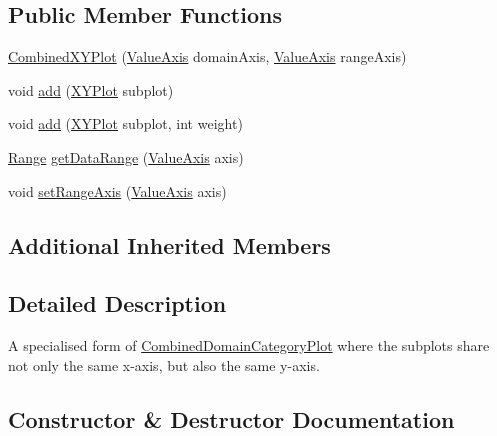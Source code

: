 \subsection*{Public Member Functions}
\begin{DoxyCompactItemize}
\item 
\mbox{\hyperlink{classorg_1_1jfree_1_1experimental_1_1chart_1_1plot_1_1_combined_x_y_plot_ac46652e5b0c36e5659511844a2f9e1cc}{Combined\+X\+Y\+Plot}} (\mbox{\hyperlink{classorg_1_1jfree_1_1chart_1_1axis_1_1_value_axis}{Value\+Axis}} domain\+Axis, \mbox{\hyperlink{classorg_1_1jfree_1_1chart_1_1axis_1_1_value_axis}{Value\+Axis}} range\+Axis)
\item 
void \mbox{\hyperlink{classorg_1_1jfree_1_1experimental_1_1chart_1_1plot_1_1_combined_x_y_plot_a36aac26f10cc8146a87f4b97f63bf9a1}{add}} (\mbox{\hyperlink{classorg_1_1jfree_1_1chart_1_1plot_1_1_x_y_plot}{X\+Y\+Plot}} subplot)
\item 
void \mbox{\hyperlink{classorg_1_1jfree_1_1experimental_1_1chart_1_1plot_1_1_combined_x_y_plot_a6548034d14f99973170b81ed654d6f47}{add}} (\mbox{\hyperlink{classorg_1_1jfree_1_1chart_1_1plot_1_1_x_y_plot}{X\+Y\+Plot}} subplot, int weight)
\item 
\mbox{\hyperlink{classorg_1_1jfree_1_1data_1_1_range}{Range}} \mbox{\hyperlink{classorg_1_1jfree_1_1experimental_1_1chart_1_1plot_1_1_combined_x_y_plot_aaf329d72ed5675a4fc2df0cc87300924}{get\+Data\+Range}} (\mbox{\hyperlink{classorg_1_1jfree_1_1chart_1_1axis_1_1_value_axis}{Value\+Axis}} axis)
\item 
void \mbox{\hyperlink{classorg_1_1jfree_1_1experimental_1_1chart_1_1plot_1_1_combined_x_y_plot_a310eec01cdf4a90b7ceef044e748d9bb}{set\+Range\+Axis}} (\mbox{\hyperlink{classorg_1_1jfree_1_1chart_1_1axis_1_1_value_axis}{Value\+Axis}} axis)
\end{DoxyCompactItemize}
\subsection*{Additional Inherited Members}


\subsection{Detailed Description}
A specialised form of \mbox{\hyperlink{}{Combined\+Domain\+Category\+Plot}} where the subplots share not only the same x-\/axis, but also the same y-\/axis. 

\subsection{Constructor \& Destructor Documentation}
\mbox{\label{classorg_1_1jfree_1_1experimental_1_1chart_1_1plot_1_1_combined_x_y_plot_ac46652e5b0c36e5659511844a2f9e1cc}} 
